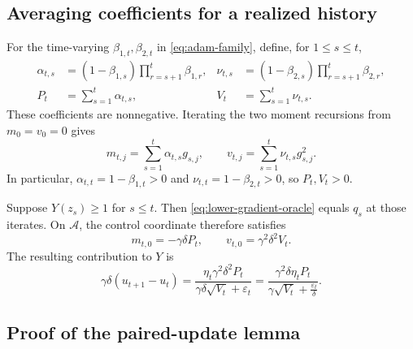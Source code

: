 \documentclass[11pt,letterpaper]{article}
\theoremstyle{definition}
\newcommand{\eps}{\varepsilon}
\begin{document}
\subsection{Averaging coefficients for a realized history}

For the time-varying $\beta_{1,t},\beta_{2,t}$ in \eqref{eq:adam-family}, define, for $1\le s\le t$,
\begin{align}
\alpha_{t,s}
&=(1-\beta_{1,s})\prod_{r=s+1}^t\beta_{1,r},
&
\nu_{t,s}
&=(1-\beta_{2,s})\prod_{r=s+1}^t\beta_{2,r},
\label{eq:time-varying-kernels}\\
P_t&=\sum_{s=1}^t\alpha_{t,s},
&
V_t&=\sum_{s=1}^t\nu_{t,s}.
\end{align}
These coefficients are nonnegative.
Iterating the two moment recursions from $m_0=v_0=0$ gives
\[
m_{t,j}=\sum_{s=1}^t\alpha_{t,s}g_{s,j},\qquad
v_{t,j}=\sum_{s=1}^t\nu_{t,s}g_{s,j}^2.
\]
In particular, $\alpha_{t,t}=1-\beta_{1,t}>0$ and
$\nu_{t,t}=1-\beta_{2,t}>0$, so $P_t,V_t>0$.

Suppose $Y(z_s)\ge1$ for $s\le t$.  Then \eqref{eq:lower-gradient-oracle} equals $q_s$ at those iterates.  On $\mathcal A$, the control coordinate therefore satisfies
\begin{equation}
m_{t,0}=-\gamma\delta P_t,
\qquad
v_{t,0}=\gamma^2\delta^2V_t.
\label{eq:control-moments}
\end{equation}
The resulting contribution to $Y$ is
\begin{equation}
\gamma\delta(u_{t+1}-u_t)
=\frac{\eta_t\gamma^2\delta^2P_t}
{\gamma\delta\sqrt{V_t}+\eps_t}
=\frac{\gamma^2\delta\eta_tP_t}
{\gamma\sqrt{V_t}+\frac{\eps_t}{\delta}}.
\label{eq:control-displacement}
\end{equation}

\subsection{Proof of the paired-update lemma}
\label{app:pair-proof}
\end{document}
